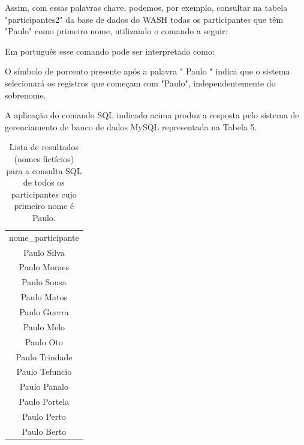 Assim, com essas palavras chave, podemos, por exemplo, consultar na tabela "participantes2"  da base de dados do WASH todas os participantes que têm "Paulo" como primeiro nome, utilizando o comando a seguir:


\noindent\begin{flushright}\mbox{\linespread{1}\selectfont\centering{}}\end{flushright}


Em português esse comando pode ser interpretado como:


\noindent\begin{flushright}\mbox{\linespread{1}\selectfont\centering{}}\end{flushright}


O símbolo de porcento presente após a palavra " Paulo " indica que o sistema selecionará os registros que começam com "Paulo", independentemente do sobrenome.

A aplicação do comando SQL indicado acima produz a resposta pelo sistema de gerenciamento de banco de dados MySQL representada na Tabela 5.





\begin{table}[htb]
\tiny
\caption{\label{fe3cd6334e1b9072eda70730e1734e26869d9c57}Lista de resultados (nomes fictícios) para a consulta SQL de todos os participantes cujo primeiro nome é Paulo.}

\centering
\begin{tabular}{|c|}
\hline
nome\_participante        \\
Paulo Silva              \\
Paulo Moraes \\
Paulo Sousa \\
Paulo Matos \\
Paulo Guerra \\
Paulo Melo \\
Paulo Oto \\
Paulo Trindade \\
Paulo Tefuncio \\
Paulo Panalo \\
Paulo Portela \\
Paulo Perto \\
Paulo Berto \\
\hline
\end{tabular}
\end{table}



